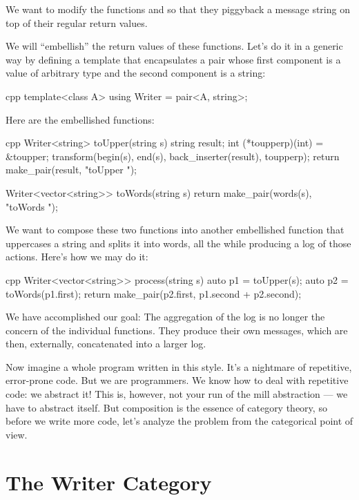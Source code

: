 \noindent
We want to modify the functions  and  so
that they piggyback a message string on top of their regular return
values.

We will ``embellish'' the return values of these functions. Let's do it
in a generic way by defining a template  that
encapsulates a pair whose first component is a value of arbitrary type
 and the second component is a string:

\begin{snip}{cpp}
template<class A>
using Writer = pair<A, string>;
\end{snip}
Here are the embellished functions:

\begin{snip}{cpp}
Writer<string> toUpper(string s) {
    string result;
    int (*toupperp)(int) = &toupper;
    transform(begin(s), end(s), back_inserter(result), toupperp);
    return make_pair(result, "toUpper "); 
}

Writer<vector<string>> toWords(string s) { 
    return make_pair(words(s), "toWords ");
}
\end{snip}
We want to compose these two functions into another embellished function
that uppercases a string and splits it into words, all the while
producing a log of those actions. Here's how we may do it:

\begin{snip}{cpp}
Writer<vector<string>> process(string s) {
    auto p1 = toUpper(s);
    auto p2 = toWords(p1.first);
    return make_pair(p2.first, p1.second + p2.second);
}
\end{snip}
We have accomplished our goal: The aggregation of the log is no longer
the concern of the individual functions. They produce their own
messages, which are then, externally, concatenated into a larger log.

Now imagine a whole program written in this style. It's a nightmare of
repetitive, error-prone code. But we are programmers. We know how to
deal with repetitive code: we abstract it! This is, however, not your
run of the mill abstraction --- we have to abstract  itself. But composition is the essence of category theory,
so before we write more code, let's analyze the problem from the
categorical point of view.

\section{The Writer Category}

